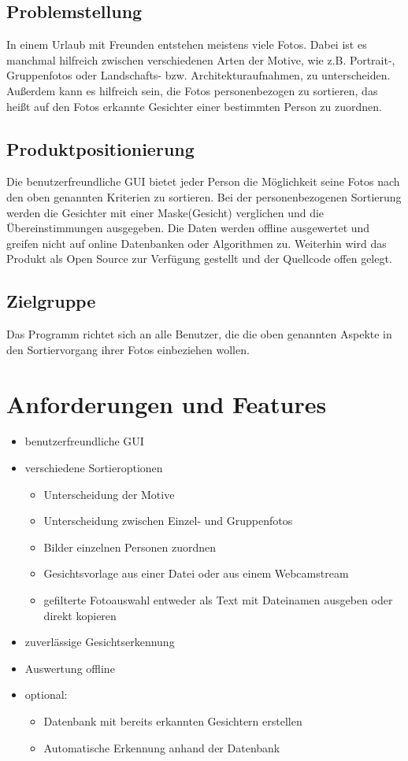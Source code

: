 \documentclass[
10pt, %
a4paper, %
oneside, %
headinclude,footinclude, %
BCOR5mm, %
]{scrartcl}
\begin{document}
\subsection{Problemstellung}
In einem Urlaub mit Freunden entstehen meistens viele Fotos. Dabei ist es manchmal hilfreich zwischen verschiedenen Arten der Motive, wie z.B. Portrait-, Gruppenfotos oder Landschafts- bzw. Architekturaufnahmen, zu unterscheiden. Außerdem kann es hilfreich sein, die Fotos personenbezogen zu sortieren, das heißt auf den Fotos erkannte Gesichter einer bestimmten Person zu zuordnen. 

\subsection{Produktpositionierung}
Die benutzerfreundliche GUI bietet jeder Person die Möglichkeit seine Fotos nach den oben genannten Kriterien zu sortieren. Bei der personenbezogenen Sortierung werden die Gesichter mit einer Maske(Gesicht) verglichen und die Übereinstimmungen ausgegeben. Die Daten werden offline ausgewertet und greifen nicht auf online Datenbanken oder Algorithmen zu. Weiterhin wird das Produkt als Open Source zur Verfügung gestellt und der Quellcode offen gelegt.

\subsection{Zielgruppe}
Das Programm richtet sich an alle Benutzer, die die oben genannten Aspekte in den Sortiervorgang ihrer Fotos einbeziehen wollen.

\section{Anforderungen und Features}
\begin{itemize}
\item benutzerfreundliche GUI
\item verschiedene Sortieroptionen
\begin{itemize}
\item Unterscheidung der Motive
\item Unterscheidung zwischen Einzel- und Gruppenfotos
\item Bilder einzelnen Personen zuordnen
\item Gesichtsvorlage aus einer Datei oder aus einem Webcamstream
\item gefilterte Fotoauswahl entweder als Text mit Dateinamen ausgeben oder direkt kopieren
\end{itemize}
\item zuverlässige Gesichtserkennung
\item Auswertung offline
\item optional:
\begin{itemize}
\item Datenbank mit bereits erkannten Gesichtern erstellen
\item Automatische Erkennung anhand der Datenbank
\end{itemize}
\end{itemize}
\end{document}
